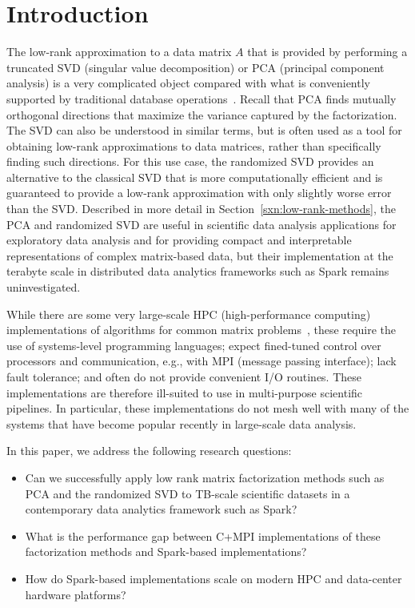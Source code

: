 \section{Introduction}
\label{sec:intro}

The low-rank approximation to a data matrix $A$ that is provided by performing
a truncated SVD (singular value decomposition) or PCA (principal component
analysis) is a very complicated object compared with
what is conveniently supported by traditional database
operations~\cite{Skillicorn07}. Recall that PCA finds mutually orthogonal
directions that maximize the variance captured by the factorization. The SVD
can also be understood in similar terms, but is often used as a tool for
obtaining low-rank approximations to data matrices, rather than specifically
finding such directions. For this use case, the randomized SVD provides an alternative
to the classical SVD that is more computationally efficient and is guaranteed to 
provide a low-rank approximation with only slightly worse error than the SVD.
Described in more detail in Section~\ref{sxn:low-rank-methods}, the PCA and randomized SVD are
useful in scientific data analysis applications for exploratory data analysis
and for providing compact and interpretable representations of complex
matrix-based data, but their implementation at the terabyte scale in distributed data
analytics frameworks such as Spark remains uninvestigated.

While there are some very large-scale HPC (high-performance computing)
implementations of algorithms for common matrix
problems~\cite{elemental,trilinos,survey-of-large-scale}, these 
require the use of systems-level programming languages; expect fined-tuned control over processors and
communication, e.g., with MPI (message passing interface); lack fault
tolerance; and often do not provide convenient I/O routines. These
implementations are therefore ill-suited to use in multi-purpose scientific 
pipelines. In particular, these implementations do not mesh well with many of
the systems that have become popular recently in large-scale data analysis. 

In this paper, we address the following research questions:
\begin{itemize}
  \item Can we successfully apply low rank matrix factorization methods such as
    PCA and the randomized SVD to TB-scale scientific datasets in a contemporary data analytics
    framework such as Spark?

  \item What is the performance gap between C+MPI implementations of these
    factorization methods and Spark-based implementations? 

  \item How do Spark-based implementations scale on modern HPC and data-center
    hardware platforms?
\end{itemize}

